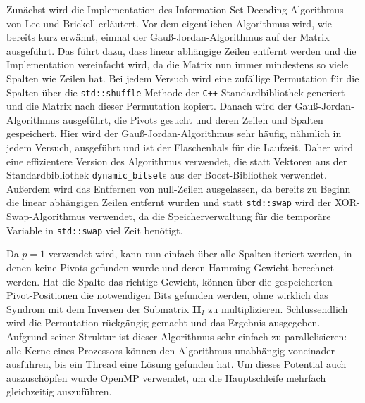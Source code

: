 \documentclass[a4paper,10pt,ngerman]{scrartcl}
\begin{document}
Zunächst wird die Implementation des Information-Set-Decoding Algorithmus von Lee und Brickell erläutert.
Vor dem eigentlichen Algorithmus wird, wie bereits kurz erwähnt, einmal der Gauß-Jordan-Algorithmus auf der Matrix ausgeführt. 
Das führt dazu, dass linear abhängige Zeilen entfernt werden und die Implementation vereinfacht wird, da die Matrix nun immer mindestens so viele Spalten wie Zeilen hat.
Bei jedem Versuch wird eine zufällige Permutation für die Spalten über die \lstinline{std::shuffle} Methode der \texttt{C++}-Standardbibliothek generiert und die Matrix nach dieser Permutation kopiert. 
Danach wird der Gauß-Jordan-Algorithmus ausgeführt, die Pivots gesucht und deren Zeilen und Spalten gespeichert. 
Hier wird der Gauß-Jordan-Algorithmus sehr häufig, nähmlich in jedem Versuch, ausgeführt und ist der Flaschenhals für die Laufzeit. 
Daher wird eine effizientere Version des Algorithmus verwendet, die statt Vektoren aus der Standardbibliothek \lstinline{dynamic_bitset}s aus der Boost-Bibliothek verwendet.
Außerdem wird das Entfernen von null-Zeilen ausgelassen, da bereits zu Beginn die linear abhängigen Zeilen entfernt wurden und statt \lstinline{std::swap} wird der XOR-Swap-Algorithmus verwendet, da die Speicherverwaltung für die temporäre Variable in \lstinline{std::swap} viel Zeit benötigt.

Da $p=1$ verwendet wird, kann nun einfach über alle Spalten iteriert werden, in denen keine Pivots gefunden wurde und deren Hamming-Gewicht berechnet werden. 
Hat die Spalte das richtige Gewicht, können über die gespeicherten Pivot-Positionen die notwendigen Bits gefunden werden, ohne wirklich das Syndrom mit dem Inversen der Submatrix $\mathbf{H}_I$ zu multiplizieren.
Schlussendlich wird die Permutation rückgängig gemacht und das Ergebnis ausgegeben. 
Aufgrund seiner Struktur ist dieser Algorithmus sehr einfach zu parallelisieren: alle Kerne eines Prozessors können den Algorithmus unabhängig voneinader ausführen, bis ein Thread eine Lösung gefunden hat.
Um dieses Potential auch auszuschöpfen wurde OpenMP verwendet, um die Hauptschleife mehrfach gleichzeitig auszuführen.
\end{document}

